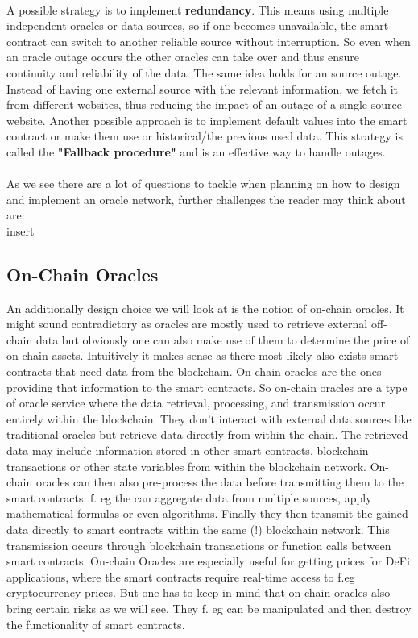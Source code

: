 \documentclass{article}
\begin{document}
\\
A possible strategy is to implement \textbf{redundancy}. This means using multiple independent oracles or data sources, so if one becomes unavailable, the smart contract can switch to another reliable source without interruption. So even when an oracle outage occurs the other oracles can take over and thus ensure continuity and reliability of the data.
The same idea holds for an source outage. Instead of having one external source with the relevant information, we fetch it from different websites, thus reducing the impact of an outage of a single source website. Another possible approach is to implement default values into the smart contract or make them use or historical/the previous used data. This strategy is called the \textbf{"Fallback procedure"} and is an effective way to handle outages.\\
\\
As we see there are a lot of questions to tackle when planning on how to design and implement an oracle network, further challenges the reader may think about are:
\\
insert 
\\

\subsection{On-Chain Oracles}
An additionally design choice we will look at is the notion of on-chain oracles. It might sound contradictory as oracles are mostly used to retrieve external off-chain data but obviously one can also make use of them to determine the price of on-chain assets. Intuitively it makes sense as there most likely also exists smart contracts that need data from the blockchain. On-chain oracles are the ones providing that information to the smart contracts. So on-chain oracles are a type of oracle service where the data retrieval, processing, and transmission occur entirely within the blockchain. They don't interact with external data sources like traditional oracles but retrieve data directly from within the chain. The retrieved data may include information stored in other smart contracts, blockchain transactions or other  state variables from within the blockchain network. On-chain oracles can then also pre-process the data before transmitting them to the smart contracts. f. eg the can aggregate data from multiple sources, apply mathematical formulas or even algorithms. Finally they then transmit the gained data directly to smart contracts within the same (!) blockchain network. This transmission occurs through blockchain transactions or function calls between smart contracts. On-chain Oracles are especially useful for getting prices for DeFi applications, where the smart contracts require real-time access to f.eg cryptocurrency prices. But one has to keep in mind that on-chain oracles also bring certain risks as we will see. They f. eg can be manipulated and then destroy the functionality of smart contracts.
\end{document}

